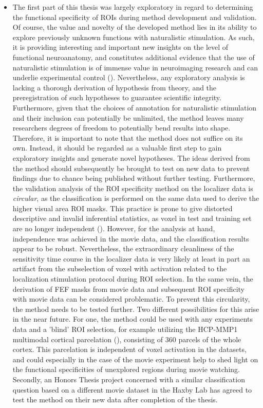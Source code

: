 \documentclass[a4paper, 12pt]{scrreprt}
\begin{document}
\begin{itemize}
 	\item The first part of this thesis was largely exploratory in regard to determining the functional specificity of ROIs during method development and validation. Of course, the value and novelty of the developed method lies in its ability to explore previously unknown functions with naturalistic stimulation. As such, it is providing interesting and important new insights on the level of functional neuroanatomy, and constitutes additional evidence that the use of naturalistic stimulation is of immense value in neuroimaging research and can underlie experimental control (\cite{hasson2004intersubject}). Nevertheless, any exploratory analysis is lacking a thorough derivation of hypothesis from theory, and the preregistration of such hypotheses to guarantee scientific integrity. Furthermore, given that the choices of annotation for naturalistic stimulation and their inclusion can potentially be unlimited, the method leaves many researchers degrees of freedom to potentially bend results into shape. Therefore, it is important to note that the method does not suffice on its own. Instead, it should be regarded as a valuable first step to gain exploratory insights and generate novel hypotheses. The ideas derived from the method should subsequently be brought to test on new data to prevent findings due to chance being published without further testing. Furthermore, the validation analysis of the ROI specificity method on the localizer data is \textit{circular}, as the classification is performed on the same data used to derive the higher visual area ROI masks. This practice is prone to give distorted descriptive and invalid inferential statistics, as voxel in test and training set are no longer independent (\cite{kriegeskorte2009circular}). However, for the analysis at hand, independence was achieved in the movie data, and the classification results appear to be robust. Nevertheless, the extraordinary cleanliness of the sensitivity time course in the localizer data is very likely at least in part an artifact from the subselection of voxel with activation related to the localization stimulation protocol during ROI selection. In the same vein, the derivation of FEF masks from movie data and subsequent ROI specificity with movie data can be considered problematic. To prevent this circularity, the method needs to be tested further. Two different possibilities for this arise in the near future. For one, the method could be used with any experiments data and a 'blind' ROI selection, for example utilizing the HCP-MMP1 multimodal cortical parcelation (\cite{glasser2016multi}), consisting of 360 parcels of the whole cortex. This parcelation is independent of voxel activation in the datasets, and could especially in the case of the movie experiment help to shed light on the functional specificities of unexplored regions during movie watching. Secondly, an Honors Thesis project concerned with a similar classification question based on a different movie dataset in the Haxby Lab has agreed to test the method on their new data after completion of the thesis.

\end{itemize}
\end{document}
